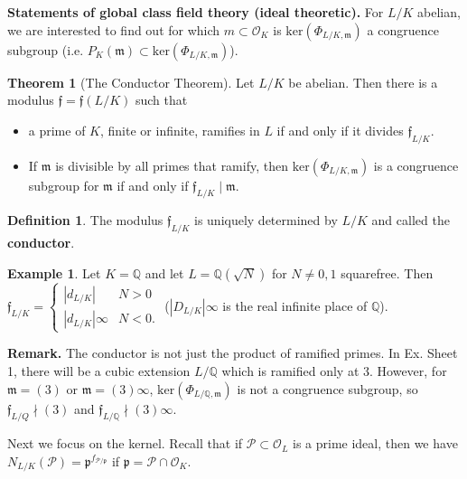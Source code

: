 \documentclass{article}
\theoremstyle{definition}
\newtheorem{theorem}{Theorem}[section]
\newtheorem{example}{Example}[section]
\newtheorem{defn}{Definition}[section]
\begin{document}
\textbf{Statements of global class field theory (ideal theoretic).} For $L/K$ abelian, we are interested to find out for which $m \subset \mathcal{O}_K$ is $\text{ker}(\Phi_{L/K,\mathfrak{m}})$ a congruence subgroup (i.e. $P_K(\mathfrak{m}) \subset \text{ker}(\Phi_{L/K, \mathfrak{m}})$).
\begin{theorem}[The Conductor Theorem]
    Let $L/K$ be abelian. Then there is a modulus $\mathfrak{f}=\mathfrak{f}(L/K)$ such that 
    \begin{itemize}
        \item a prime of $K$, finite or infinite, ramifies in $L$ if and only if it divides $\mathfrak{f}_{L/K}$.
        \item If $\mathfrak{m}$ is divisible by all primes that ramify, then $\text{ker}(\Phi_{L/K, \mathfrak{m}})$ is a congruence subgroup for $\mathfrak{m}$ if and only if $\mathfrak{f}_{L/K} \mid \mathfrak{m}$.
    \end{itemize}
\end{theorem}
\begin{defn}
    The modulus $\mathfrak{f}_{L/K}$ is uniquely determined by $L/K$ and called the \textbf{conductor}.
\end{defn}
\begin{example}
    Let $K=\mathbb{Q}$ and let $L = \mathbb{Q}(\sqrt{N})$ for $N \neq 0,1$ squarefree. Then $\mathfrak{f}_{L/K} = \begin{cases}
        \left|d_{L/K} \right| & N>0\\
        \left|d_{L/K} \right|{\infty} & N<0.
    \end{cases}$ ($\left|D_{L/K}\right|{\infty}$ is the real infinite place of $\mathbb{Q}$).
\end{example}
\textbf{Remark.} The conductor is not just the product of ramified primes. In Ex. Sheet 1, there will be a cubic extension $L/\mathbb{Q}$ which is ramified only at 3. However, for $\mathfrak{m} = (3)$ or $\mathfrak{m} = (3)\infty$, $\text{ker}(\Phi_{L/\mathbb{Q},\mathfrak{m}})$ is not a congruence subgroup, so $\mathfrak{f}_{L/Q}\nmid (3)$ and $\mathfrak{f}_{L/\mathbb{Q}}\nmid (3)\infty$.
\vspace{1mm}
 
Next we focus on the kernel. Recall that if $\mathcal{P} \subset \mathcal{O}_L$ is a prime ideal, then we have $N_{L/K}(\mathcal{P}) = \mathfrak{p}^{f_{\mathcal{P}/\mathfrak{p}}}$ if $\mathfrak{p} = \mathcal{P} \cap \mathcal{O}_K$.
\vspace{1mm}
 
\end{document}
